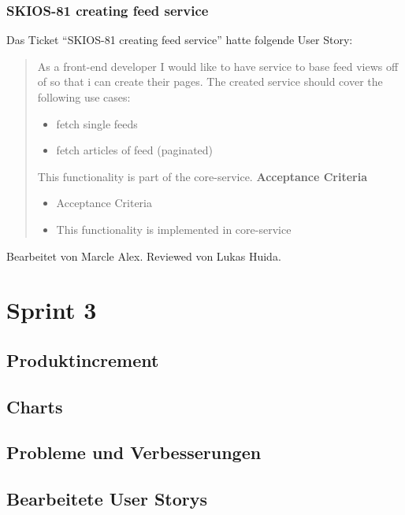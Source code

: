 \subsubsection{SKIOS-81 creating feed service}
Das Ticket \enquote{SKIOS-81 creating feed service} hatte folgende User Story:
\begin{quotation}
As a front-end developer I would like to have service to base feed views off of so that i can create their pages.
The created service should cover the following use cases:
\begin{itemize}
    \item fetch single feeds
    \item fetch articles of feed (paginated)
\end{itemize}
This functionality is part of the core-service.
\textbf{Acceptance Criteria}
\begin{itemize}
    \item Acceptance Criteria
    \item This functionality is implemented in core-service
\end{itemize}
\end{quotation}
Bearbeitet von Marcle Alex.
Reviewed von Lukas Huida.

\section{Sprint 3}

\subsection{Produktincrement}
\subsection{Charts}
\subsection{Probleme und Verbesserungen}

\subsection{Bearbeitete User Storys}
